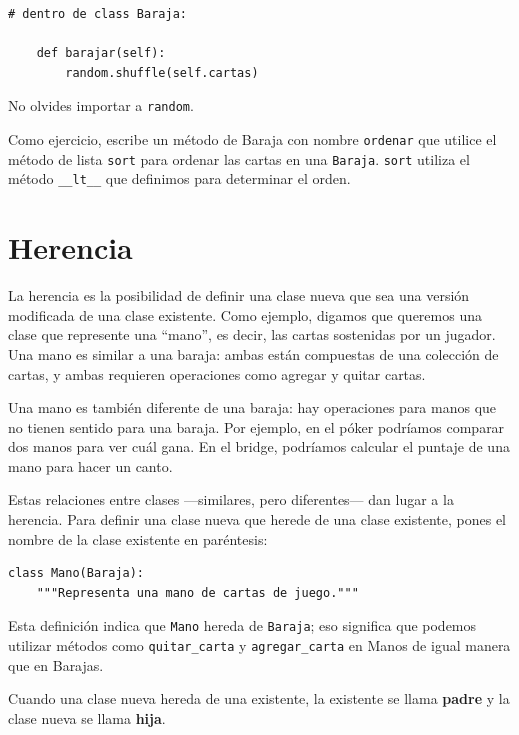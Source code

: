 \documentclass[10pt]{book}
\begin{document}
\begin{verbatim}
# dentro de class Baraja:

    def barajar(self):
        random.shuffle(self.cartas)
\end{verbatim}
%
No olvides importar a {\tt random}.

Como ejercicio, escribe un método de Baraja con nombre {\tt ordenar} que utilice el
método de lista {\tt sort} para ordenar las cartas en una {\tt Baraja}.  {\tt sort}
utiliza el método \verb"__lt__" que definimos para determinar el orden.
 



\section{Herencia}

La herencia es la posibilidad de definir una clase nueva que sea una versión
modificada de una clase existente.  Como ejemplo, digamos que queremos una
clase que represente una ``mano'', es decir, las cartas sostenidas por un jugador.
Una mano es similar a una baraja: ambas están compuestas de una colección de
cartas, y ambas requieren operaciones como agregar y quitar cartas.

Una mano es también diferente de una baraja: hay operaciones para
manos que no tienen sentido para una baraja.  Por ejemplo, en el póker
podríamos comparar dos manos para ver cuál gana.  En el bridge, podríamos
calcular el puntaje de una mano para hacer un canto.

Estas relaciones entre clases ---similares, pero diferentes--- dan lugar
a la herencia.
Para definir una clase nueva que herede de una clase existente,
pones el nombre de la clase existente en paréntesis:

\begin{verbatim}
class Mano(Baraja):
    """Representa una mano de cartas de juego."""
\end{verbatim}
%
Esta definición indica que {\tt Mano} hereda de {\tt Baraja};
eso significa que podemos utilizar métodos como \verb"quitar_carta" y \verb"agregar_carta"
en Manos de igual manera que en Barajas.

Cuando una clase nueva hereda de una existente, la existente
se llama {\bf padre} y la clase nueva se
llama {\bf hija}.
\end{document}

